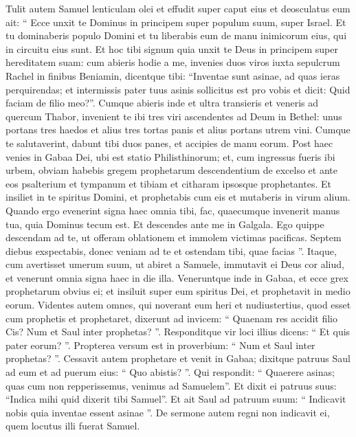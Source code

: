 \begin{biblechapter}
\begin{biblechapter}
\begin{biblechapter}
\begin{biblechapter}
\begin{biblechapter}
\begin{biblechapter}
\begin{biblechapter}
\begin{biblechapter}
\begin{biblechapter}
\begin{biblechapter}
\verse Tulit autem Samuel lenticulam olei et effudit super caput eius et deosculatus eum ait: “ Ecce unxit te Dominus in principem super populum suum, super Israel. Et tu dominaberis populo Domini et tu liberabis eum de manu inimicorum eius, qui in circuitu eius sunt. Et hoc tibi signum quia unxit te Deus in principem super hereditatem suam: 
\verse cum abieris hodie a me, invenies duos viros iuxta sepulcrum Rachel in finibus Beniamin, dicentque tibi: “Inventae sunt asinae, ad quas ieras perquirendas; et intermissis pater tuus asinis sollicitus est pro vobis et dicit: Quid faciam de filio meo?”. 
\verse Cumque abieris inde et ultra transieris et veneris ad quercum Thabor, invenient te ibi tres viri ascendentes ad Deum in Bethel: unus portans tres haedos et alius tres tortas panis et alius portans utrem vini. 
\verse Cumque te salutaverint, dabunt tibi duos panes, et accipies de manu eorum. 
\verse Post haec venies in Gabaa Dei, ubi est statio Philisthinorum; et, cum ingressus fueris ibi urbem, obviam habebis gregem prophetarum descendentium de excelso et ante eos psalterium et tympanum et tibiam et citharam ipsosque prophetantes. 
\verse Et insiliet in te spiritus Domini, et prophetabis cum eis et mutaberis in virum alium. 
\verse Quando ergo evenerint signa haec omnia tibi, fac, quaecumque invenerit manus tua, quia Dominus tecum est. 
\verse Et descendes ante me in Galgala. Ego quippe descendam ad te, ut offeram oblationem et immolem victimas pacificas. Septem diebus exspectabis, donec veniam ad te et ostendam tibi, quae facias ”.
 \verse Itaque, cum avertisset umerum suum, ut abiret a Samuele, immutavit ei Deus cor aliud, et venerunt omnia signa haec in die illa. 
\verse Veneruntque inde in Gabaa, et ecce grex prophetarum obvius ei; et insiluit super eum spiritus Dei, et prophetavit in medio eorum. 
\verse Videntes autem omnes, qui noverant eum heri et nudiustertius, quod esset cum prophetis et prophetaret, dixerunt ad invicem: “ Quaenam res accidit filio Cis? Num et Saul inter prophetas? ”. 
\verse Responditque vir loci illius dicens: “ Et quis pater eorum? ”. Propterea versum est in proverbium: “ Num et Saul inter prophetas? ”.
 \verse Cessavit autem prophetare et venit in Gabaa; 
\verse dixitque patruus Saul ad eum et ad puerum eius: “ Quo abistis? ”. Qui respondit: “ Quaerere asinas; quas cum non repperissemus, venimus ad Samuelem”. 
\verse Et dixit ei patruus suus: “Indica mihi quid dixerit tibi Samuel”. 
\verse Et ait Saul ad patruum suum: “ Indicavit nobis quia inventae essent asinae ”. De sermone autem regni non indicavit ei, quem locutus illi fuerat Samuel.

\end{biblechapter}
\end{biblechapter}
\end{biblechapter}
\end{biblechapter}
\end{biblechapter}
\end{biblechapter}
\end{biblechapter}
\end{biblechapter}
\end{biblechapter}
\end{biblechapter}
